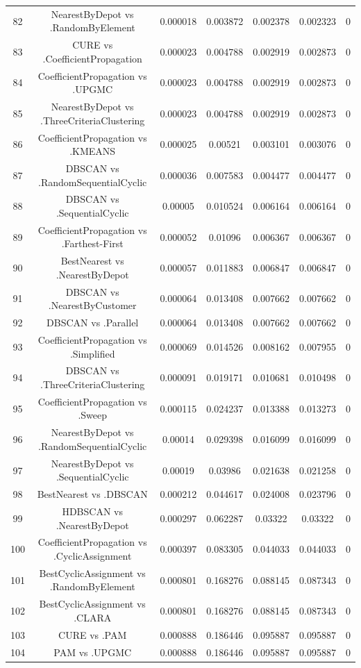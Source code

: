 \documentclass[a4paper,10pt]{article}
\begin{document}
\begin{landscape}
\begin{table}[!htp]
\begin{tabular}{ccccccc}
82&NearestByDepot vs .RandomByElement&0.000018&0.003872&0.002378&0.002323&0\\
83&CURE vs .CoefficientPropagation&0.000023&0.004788&0.002919&0.002873&0\\
84&CoefficientPropagation vs .UPGMC&0.000023&0.004788&0.002919&0.002873&0\\
85&NearestByDepot vs .ThreeCriteriaClustering&0.000023&0.004788&0.002919&0.002873&0\\
86&CoefficientPropagation vs .KMEANS&0.000025&0.00521&0.003101&0.003076&0\\
87&DBSCAN vs .RandomSequentialCyclic&0.000036&0.007583&0.004477&0.004477&0\\
88&DBSCAN vs .SequentialCyclic&0.00005&0.010524&0.006164&0.006164&0\\
89&CoefficientPropagation vs .Farthest-First&0.000052&0.01096&0.006367&0.006367&0\\
90&BestNearest vs .NearestByDepot&0.000057&0.011883&0.006847&0.006847&0\\
91&DBSCAN vs .NearestByCustomer&0.000064&0.013408&0.007662&0.007662&0\\
92&DBSCAN vs .Parallel&0.000064&0.013408&0.007662&0.007662&0\\
93&CoefficientPropagation vs .Simplified&0.000069&0.014526&0.008162&0.007955&0\\
94&DBSCAN vs .ThreeCriteriaClustering&0.000091&0.019171&0.010681&0.010498&0\\
95&CoefficientPropagation vs .Sweep&0.000115&0.024237&0.013388&0.013273&0\\
96&NearestByDepot vs .RandomSequentialCyclic&0.00014&0.029398&0.016099&0.016099&0\\
97&NearestByDepot vs .SequentialCyclic&0.00019&0.03986&0.021638&0.021258&0\\
98&BestNearest vs .DBSCAN&0.000212&0.044617&0.024008&0.023796&0\\
99&HDBSCAN vs .NearestByDepot&0.000297&0.062287&0.03322&0.03322&0\\
100&CoefficientPropagation vs .CyclicAssignment&0.000397&0.083305&0.044033&0.044033&0\\
101&BestCyclicAssignment vs .RandomByElement&0.000801&0.168276&0.088145&0.087343&0\\
102&BestCyclicAssignment vs .CLARA&0.000801&0.168276&0.088145&0.087343&0\\
103&CURE vs .PAM&0.000888&0.186446&0.095887&0.095887&0\\
104&PAM vs .UPGMC&0.000888&0.186446&0.095887&0.095887&0\\

\end{tabular}
\end{table}
\end{landscape}
\end{document}
